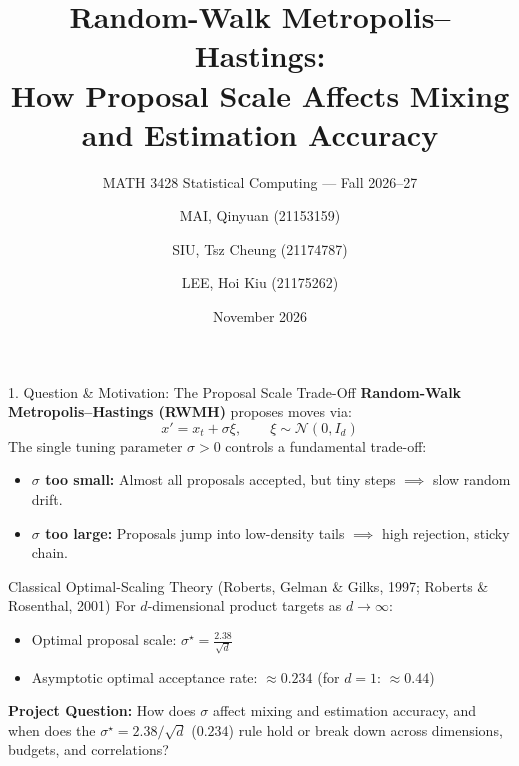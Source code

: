 \documentclass[aspectratio=169, 10pt]{beamer}
\title[RWMH Proposal Scaling]{Random-Walk Metropolis--Hastings:\\How Proposal Scale Affects Mixing and Estimation Accuracy}
\subtitle{MATH 3428 Statistical Computing — Fall 2026--27}
\author[Mai, Siu, Lee]{MAI, Qinyuan (21153159) \and SIU, Tsz Cheung (21174787) \and LEE, Hoi Kiu (21175262)}
\date{November 2026}
\begin{document}
\begin{frame}
  \titlepage
\end{frame}

\begin{frame}{1. Question \& Motivation: The Proposal Scale Trade-Off}
  \textbf{Random-Walk Metropolis--Hastings (RWMH)} proposes moves via:
  \[
    x' = x_t + \sigma \xi, \qquad \xi \sim \mathcal{N}(0, I_d)
  \]
  The single tuning parameter $\sigma > 0$ controls a fundamental trade-off:
  \begin{itemize}
    \item \textbf{$\sigma$ too small:} Almost all proposals accepted, but tiny steps $\implies$ slow random drift.
    \item \textbf{$\sigma$ too large:} Proposals jump into low-density tails $\implies$ high rejection, sticky chain.
  \end{itemize}

  \vspace{0.3em}
  \begin{block}{Classical Optimal-Scaling Theory (Roberts, Gelman \& Gilks, 1997; Roberts \& Rosenthal, 2001)}
    For $d$-dimensional product targets as $d \to \infty$:
    \begin{itemize}
      \item Optimal proposal scale: $\displaystyle \sigma^\star = \frac{2.38}{\sqrt{d}}$
      \item Asymptotic optimal acceptance rate: $\approx \mathbf{0.234}$ \quad (for $d=1$: $\approx \mathbf{0.44}$)
    \end{itemize}
  \end{block}

  \vspace{0.2em}
  \textbf{Project Question:} How does $\sigma$ affect mixing and estimation accuracy, and when does the $\sigma^\star = 2.38/\sqrt{d}$ ($0.234$) rule hold or break down across dimensions, budgets, and correlations?
\end{frame}
\end{document}
